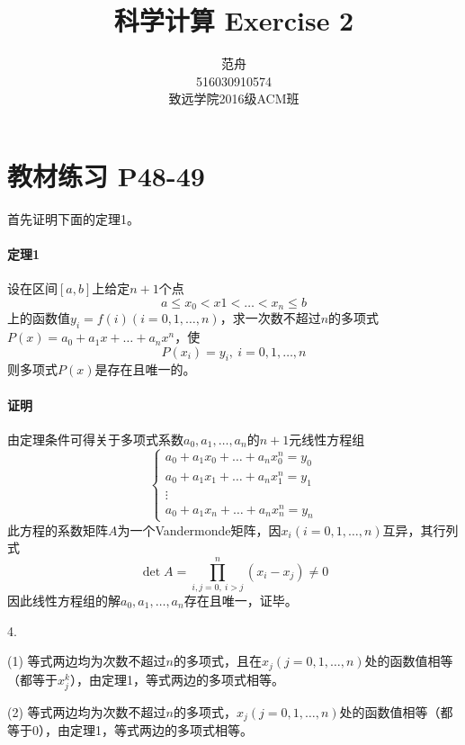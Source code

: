 \documentclass[12pt, a4paper]{article}
\title{科学计算 Exercise 2}
\author{范舟\\516030910574\\致远学院2016级ACM班}
\date{}
\theoremstyle{margin}
\begin{document}
\maketitle

\section{教材练习 P48-49}

首先证明下面的定理1。

\paragraph{定理1} 设在区间$\left[a,b\right]$上给定$n+1$个点
$$a\leq x_0<x1<\dots<x_n\leq b$$
上的函数值$y_i=f\left(i\right)\left(i=0,1,\dots,n\right)$，求一次数不超过$n$的多项式$P\left(x\right)=a_0+a_1 x+\dots+a_n x^n$，使
$$P\left(x_i\right)=y_i,\ i=0,1,\dots,n$$
则多项式$P(x)$是存在且唯一的。

\paragraph{证明} 由定理条件可得关于多项式系数$a_0,a_1,\dots,a_n$的$n+1$元线性方程组
$$\left\{\begin{matrix}
a_0 + a_1 x_0 + \dots + a_n x_0^n = y_0 \\ 
a_0 + a_1 x_1 + \dots + a_n x_1^n = y_1 \\ 
\vdots  \\ 
a_0 + a_1 x_n + \dots + a_n x_n^n = y_n
\end{matrix}\right.$$
此方程的系数矩阵$A$为一个Vandermonde矩阵，因$x_i\left(i=0,1,\dots,n\right)$互异，其行列式
$$\det A=\prod_{i,j=0,\ i>j}^{n}\left(x_i-x_j\right) \ne 0$$ 
因此线性方程组的解$a_0,a_1,\dots,a_n$存在且唯一，证毕。
\newline

4.

(1) 等式两边均为次数不超过$n$的多项式，且在$x_j\left(j=0,1,\dots,n\right)$处的函数值相等（都等于$x_j^k$），由定理1，等式两边的多项式相等。

(2) 等式两边均为次数不超过$n$的多项式，$x_j\left(j=0,1,\dots,n\right)$处的函数值相等（都等于$0$），由定理1，等式两边的多项式相等。
\newline
\end{document}
